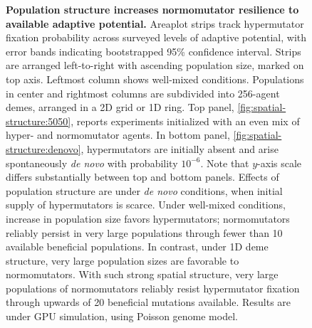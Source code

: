 \begin{figure}[h]
\begin{minipage}{\textwidth}
  \end{minipage}

  \vspace{-10ex}

  \begin{minipage}{\textwidth}
    \caption{%
      \textbf{Population structure increases normomutator resilience to available adaptive potential.}
      \footnotesize
      Areaplot strips track hypermutator fixation probability across surveyed levels of adaptive potential, with error bands indicating bootstrapped 95\% confidence interval.
      Strips are arranged left-to-right with ascending population size, marked on top axis.
      Leftmost column shows well-mixed conditions.
      Populations in center and rightmost columns are subdivided into 256-agent demes, arranged in a 2D grid or 1D ring.
      Top panel, \ref{fig:spatial-structure:5050}, reports experiments initialized with an even mix of hyper- and normomutator agents.
      In bottom panel, \ref{fig:spatial-structure:denovo}, hypermutators are initially absent and arise spontaneously \textit{de novo} with probability $10^{-6}$.
      Note that $y$-axis scale differs substantially between top and bottom panels.
      Effects of population structure are under \textit{de novo} conditions, when initial supply of hypermutators is scarce.
      Under well-mixed conditions, increase in population size favors hypermutators; normomutators reliably persist in very large populations through fewer than 10 available beneficial populations.
      In contrast, under 1D deme structure, very large population sizes are favorable to normomutators.
      With such strong spatial structure, very large populations of normomutators reliably resist hypermutator fixation through upwards of 20 beneficial mutations available.
      Results are under GPU simulation, using Poisson genome model.
    }
    \label{fig:spatial-structure}
  \end{minipage}
\end{figure}
